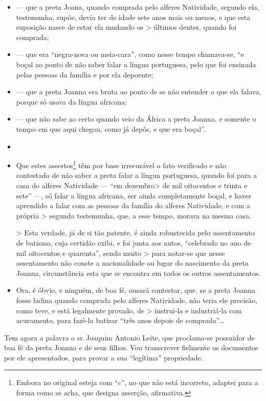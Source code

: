 \begin{itemize}
\item
  --- que a preta Joana, quando comprada pelo alferes Natividade, segundo
  ela, testemunha, supõe, devia ter de idade sete anos mais ou menos, e
  que esta suposição nasce de estar ela mudando os \textgreater{}
  últimos dentes, quando foi comprada;
\item
  --- que era ``negra-nova ou meia-cara'', como nesse tempo chamava-se, ``e
  boçal ao ponto de não saber falar a língua portuguesa, pelo que foi
  ensinada pelas pessoas da família e por ela depoente;
\item
  --- que a preta Joanna era bruta ao ponto de se não entender o que ela
  falava, porque só usava da língua africana;
\item
  --- que não sabe ao certo quando veio da África a preta Joanna, e
  somente o tempo em que aqui chegou, como já depôs, e que era boçal''.
\item
\item
  Que estes assertos\footnote{ Embora no original esteja com ``c'', no
    que não está incorreto, adaptei para a forma como se acha, que
    designa asserção, afirmativa.} têm por base irrecusável o fato
  verificado e não contestado de não saber a preta falar a língua
  portuguesa, quando foi para a casa do alferes Natividade --- ``em
  dezembro\textgreater{} de mil oitocentos e trinta e sete'' ---, só
  falar a língua africana, ser ainda completamente boçal, e haver
  aprendido a falar com as pessoas da família do alferes Natividade, e
  com a própria \textgreater{} segunda testemunha, que, a esse tempo,
  morava na mesma casa.

  \textgreater{} Esta verdade, já de si tão patente, é ainda robustecida
  pelo assentamento de batismo, cuja certidão exibi, e foi junta aos
  autos, ``celebrado no ano de mil oitocentos e quarenta'', sendo muito
  \textgreater{} para notar-se que nesse assentamento não conste a
  nacionalidade ou lugar do nascimento da preta Joanna, circunstância
  esta que se encontra em todos os outros assentamentos.
\item
  Ora, é óbvio, e ninguém, de boa fé, ousará contestar, que, se a preta
  Joanna fosse ladina quando comprada pelo alferes Natividade, não teria
  ele precisão, como teve, e está legalmente provado, de \textgreater{}
  instrui-la e industriá-la com acuramento, para fazê-la batizar ``três
  anos depois de comprada''\ldots{}
\end{itemize}

Tem agora a palavra o sr.\,Joaquim Antonio Leite, que proclama-se
possuidor de boa fé da preta Joanna e de seus filhos. Vou transcrever
fielmente os documentos por ele apresentados, para provar a sua
``legítima'' propriedade.

